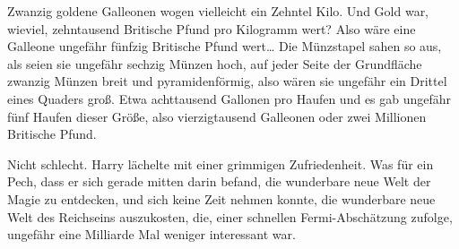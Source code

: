 Zwanzig goldene Galleonen wogen vielleicht ein Zehntel Kilo. Und Gold war, wieviel, zehntausend Britische Pfund pro Kilogramm wert? Also wäre eine Galleone ungefähr fünfzig Britische Pfund wert… Die Münzstapel sahen so aus, als seien sie ungefähr sechzig Münzen hoch, auf jeder Seite der Grundfläche zwanzig Münzen breit und pyramidenförmig, also wären sie ungefähr ein Drittel eines Quaders groß. Etwa achttausend Gallonen pro Haufen und es gab ungefähr fünf Haufen dieser Größe, also vierzigtausend Galleonen oder zwei Millionen Britische Pfund.

Nicht schlecht. Harry lächelte mit einer grimmigen Zufriedenheit. Was für ein Pech, dass er sich gerade mitten darin befand, die wunderbare neue Welt der Magie zu entdecken, und sich keine Zeit nehmen konnte, die wunderbare neue Welt des Reichseins auszukosten, die, einer schnellen Fermi-Abschätzung zufolge, ungefähr eine Milliarde Mal weniger interessant war.

